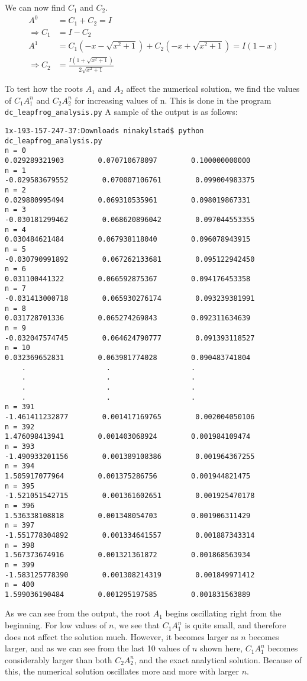 \documentclass[12pt]{article} %
\begin{document}
We can now find $C_1$ and $C_2$.
\begin{align*}
A^0 &= C_1 + C_2 = I\\
\Rightarrow C_1 &= I - C_2\\
A^1 &= C_1(-x - \sqrt{x^2 +1}) + C_2(-x + \sqrt{x^2 +1}) = I(1 - x)\\
\Rightarrow C_2 &= \frac{I(1 + \sqrt{x^2 +1})}{2\sqrt{x^2 +1}}
\end{align*}

To test how the roots $A_1$ and $A_2$ affect the numerical solution, we find the values of $C_1A_1^n$ and $C_2A_2^n$ for increasing values of n. This is done in the program \texttt{dc\_leapfrog\_analysis.py} A sample of the output is as follows:

\begin{verbatim}
1x-193-157-247-37:Downloads ninakylstad$ python dc_leapfrog_analysis.py
n = 0
0.029289321903        0.070710678097        0.100000000000
n = 1
-0.029583679552        0.070007106761        0.099004983375
n = 2
0.029880995494        0.069310535961        0.098019867331
n = 3
-0.030181299462        0.068620896042        0.097044553355
n = 4
0.030484621484        0.067938118040        0.096078943915
n = 5
-0.030790991892        0.067262133681        0.095122942450
n = 6
0.031100441322        0.066592875367        0.094176453358
n = 7
-0.031413000718        0.065930276174        0.093239381991
n = 8
0.031728701336        0.065274269843        0.092311634639
n = 9
-0.032047574745        0.064624790777        0.091393118527
n = 10
0.032369652831        0.063981774028        0.090483741804
	.					.					.
	.					.					.
	.					.					.
	.					.					.
n = 391
-1.461411232877        0.001417169765        0.002004050106
n = 392
1.476098413941        0.001403068924        0.001984109474
n = 393
-1.490933201156        0.001389108386        0.001964367255
n = 394
1.505917077964        0.001375286756        0.001944821475
n = 395
-1.521051542715        0.001361602651        0.001925470178
n = 396
1.536338108818        0.001348054703        0.001906311429
n = 397
-1.551778304892        0.001334641557        0.001887343314
n = 398
1.567373674916        0.001321361872        0.001868563934
n = 399
-1.583125778390        0.001308214319        0.001849971412
n = 400
1.599036190484        0.001295197585        0.001831563889
\end{verbatim}

As we can see from the output, the root $A_1$ begins oscillating right from the beginning. For low values of $n$, we see that $C_1A_1^n$ is quite small, and therefore does not affect the solution much. However, it becomes larger as $n$ becomes larger, and as we can see from the last 10 values of $n$ shown here, $C_1A_1^n$ becomes considerably larger than both $C_2A_2^n$, and the exact analytical solution. Because of this, the numerical solution oscillates more and more with larger $n$. 
\end{document}
